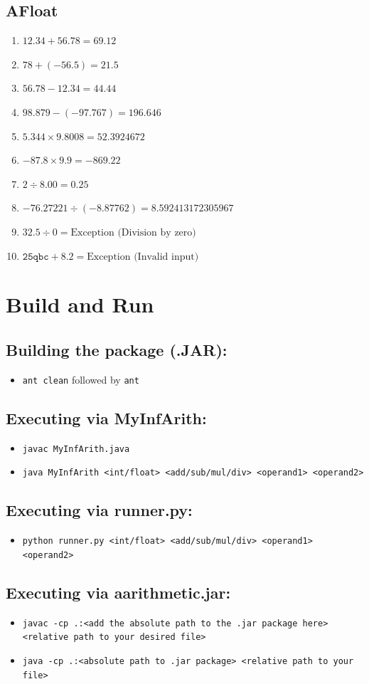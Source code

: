 \documentclass[12pt]{article}
\begin{document}
\subsection{AFloat}
\begin{enumerate}
    \item \(12.34 + 56.78 = 69.12\)
    \item \(78 + (-56.5) = 21.5\)
    \item \(56.78 - 12.34 = 44.44\)
    \item \(98.879 - (-97.767) = 196.646\)
    \item \(5.344 \times 9.8008 = 52.3924672\)
    \item \(-87.8 \times 9.9 = -869.22\)
    \item \(2 \div 8.00 = 0.25\)
    \item \(-76.27221 \div (-8.87762) = 8.592413172305967\)
    \item \(32.5 \div 0 = \text{Exception (Division by zero)}\)
    \item \(\texttt{25qbc} + 8.2 = \text{Exception (Invalid input)}\)

\end{enumerate}

\section{Build and Run}

\subsection{Building the package (.JAR):}
\begin{itemize}
    \item \texttt{ant clean} followed by \texttt{ant}
\end{itemize}

\subsection{Executing via MyInfArith:}
\begin{itemize}
    \item \texttt{javac MyInfArith.java}
    \item \texttt{java MyInfArith <int/float> <add/sub/mul/div> <operand1> <operand2>}
\end{itemize}

\subsection{Executing via runner.py:} 
\begin{itemize}
    \item \texttt{python runner.py <int/float> <add/sub/mul/div> <operand1> <operand2>}
\end{itemize}

\subsection{Executing via aarithmetic.jar:} 
\begin{itemize}
    \item \texttt{javac -cp .:<add the absolute path to the .jar package here> <relative path to your desired file>}
    \item \texttt{java -cp .:<absolute path to .jar package> <relative path to your file>}
\end{itemize}
\end{document}
